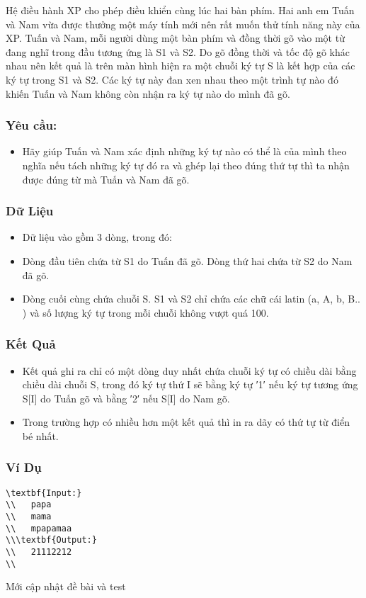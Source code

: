 



   Hệ điều hành XP cho phép điều khiển cùng lúc hai bàn phím. Hai anh em Tuấn và Nam vừa được thưởng một máy tính mới nên rất muốn thử tính năng này của XP. Tuấn và Nam, mỗi người dùng một bàn phím và đồng thời gõ vào một từ đang nghĩ trong đầu tương ứng là S1 và S2. Do gõ đồng thời và tốc độ gõ khác nhau nên kết quả là trên màn hình hiện ra một chuỗi ký tự S là kết hợp của các ký tự trong S1 và S2. Các ký tự này đan xen nhau theo một trình tự nào đó khiến Tuấn và Nam không còn nhận ra ký tự nào do mình đã gõ.  

\subsubsection{   Yêu cầu:  }
\begin{itemize}
	\item     Hãy giúp Tuấn và Nam xác định những ký tự nào có thể  là của mình theo nghĩa nếu tách những ký tự đó ra và ghép lại theo đúng thứ tự thì ta nhận được đúng từ mà Tuấn và Nam đã gõ.   
\end{itemize}

\subsubsection{   Dữ Liệu  }
\begin{itemize}
	\item     Dữ liệu vào gồm 3 dòng, trong đó:   
	\item     Dòng đầu tiên chứa từ S1 do Tuấn đã gõ. Dòng thứ hai chứa từ S2 do Nam đã gõ.   
	\item     Dòng cuối cùng chứa chuỗi S. S1 và S2 chỉ chứa các chữ cái latin (a, A, b, B.. ) và số lượng ký tự trong mỗi chuỗi không vượt quá 100.   
\end{itemize}

\subsubsection{   Kết Quả  }
\begin{itemize}
	\item     Kết quả ghi ra chỉ có một dòng duy nhất chứa chuỗi ký tự có chiều dài bằng chiều dài chuỗi S, trong đó ký tự thứ I sẽ bằng ký tự ′1′ nếu ký tự tương ứng S[I] do Tuấn gõ và bằng ′2′ nếu S[I] do Nam gõ.   
	\item     Trong trường hợp có nhiều hơn một kết quả thì in ra dãy có thứ tự từ điển bé nhất.   
\end{itemize}

\subsubsection{   Ví Dụ  }
\begin{verbatim}
\textbf{Input:}
\\   papa
\\   mama
\\   mpapamaa
\\\textbf{Output:}
\\   21112212
\\\end{verbatim}
	\item    Mới cập nhật đề bài và test  